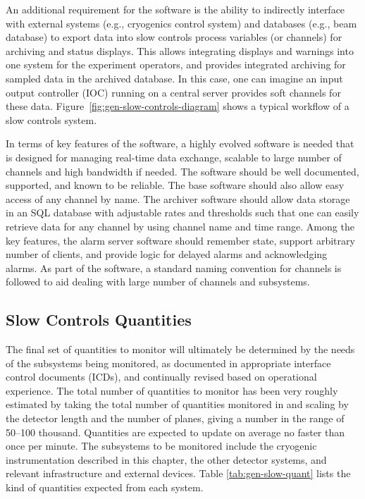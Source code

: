 An additional requirement for the software is the ability to indirectly
interface with external systems (e.g., cryogenics control
system) and databases (e.g., beam database) to export data into
slow controls process variables (or channels) for archiving and status
displays. This allows integrating displays and warnings into one
system for the experiment operators, and %
provides integrated
archiving for sampled data in the archived database. In this case, one
can imagine an input output controller (IOC) running on a central 
server provides soft channels for these data.
Figure~\ref{fig:gen-slow-controls-diagram} shows a typical workflow of a
slow controls system.

In terms of key features of the software, a highly evolved software is
needed that is designed for managing real-time data exchange, scalable
to large number of channels and high bandwidth if needed. The software
should be well documented, supported, and known to be reliable. The base
software should also allow easy access of any channel by name. The
archiver software should allow data storage in an SQL database with
adjustable rates and thresholds such that one can easily retrieve data
for any channel by using channel name and time range. Among the key
features, the alarm server software should remember state, support
arbitrary number of clients, and provide logic for delayed alarms and
acknowledging alarms. As part of the software, a standard naming
convention for channels is followed to aid dealing with large
number of channels and subsystems.


\subsection{Slow Controls Quantities}
\label{sec:fddp-slow-cryo-quant}


The final set of quantities to monitor will ultimately be determined
by the needs of the subsystems being monitored, as documented in
appropriate  interface control documents (ICDs), and continually revised based on operational
experience.  The total number of quantities to monitor has been very
roughly estimated by taking the total number of quantities monitored
in \microboone and scaling by the detector length and the number of
planes, giving a number in the range of \numrange{50}{100} thousand.
Quantities are expected to update on average no faster than once per minute.
The subsystems
to be monitored include the %
cryogenic instrumentation
described in this chapter, the other detector systems, and relevant
infrastructure and external devices. Table \ref{tab:gen-slow-quant}
lists the kind of quantities expected from each system.

